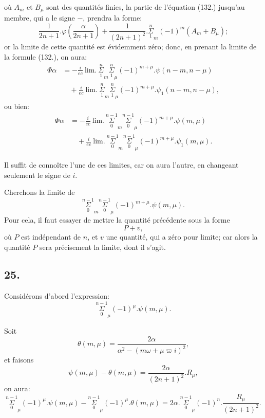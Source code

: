 \documentclass{article}
\begin{document}
où $A_{m}$ et $B_{\mu}$ sont des quantités finies, la partie de l'équation (132.) jusqu'au membre, qui a le signe $-$, prendra la forme:
\[ \frac{1}{2n+1}.\varphi\left(\frac{\alpha}{2n+1}\right)+\frac{1}{(2n+1)^{2}}.\overset{n}{\underset{1}{\Sigma}}_{m}(-1)^{m}(A_{m}+B_{\mu}); \]
or la limite de cette quantité est évidemment zéro; donc, en prenant la limite de la formule (132.), on aura:
\[ \begin{aligned}
\Phi\alpha&=-\frac{i}{ec}\ \text{lim.}\ \overset{n}{\underset{1}{\Sigma}}_{m}\overset{n}{\underset{1}{\Sigma}}_{\mu}(-1)^{m+\mu}.\psi(n-m,n-\mu)\\
&\quad+\frac{i}{ec}\ \text{lim.}\ \overset{n}{\underset{1}{\Sigma}}_{m}\overset{n}{\underset{1}{\Sigma}}_{\mu}(-1)^{m+\mu}.\psi_{1}(n-m,n-\mu),
\end{aligned} \]
ou bien:
\[ \begin{aligned}
\Phi\alpha&=-\frac{i}{ec}\ \text{lim.}\ \overset{n-1}{\underset{0}{\Sigma}}_{m}\overset{n-1}{\underset{0}{\Sigma}}_{\mu}(-1)^{m+\mu}.\psi(m,\mu)\\
&\quad+\frac{i}{ec}\ \text{lim.}\ \overset{n-1}{\underset{0}{\Sigma}}_{m}\overset{n-1}{\underset{0}{\Sigma}}_{\mu}(-1)^{m+\mu}.\psi_{1}(m,\mu).
\end{aligned} \tag{134.} \]

Il suffit de connoître l'une de ces limites, car on aura l'autre, en changeant seulement le signe de $i$.

Cherchons la limite de
\[ \overset{n-1}{\underset{0}{\Sigma}}_{m}\overset{n-1}{\underset{0}{\Sigma}}_{\mu}(-1)^{m+\mu}.\psi(m,\mu). \]
Pour cela, il faut essayer de mettre la quantité précédente sous la forme
\[ P+v, \]
où $P$ est indépendant de $n$, et $v$ une quantité, qui a zéro pour limite; car alors la quantité $P$ sera précisement la limite, dont il s'agit.

\subsection*{25.}

Considérons d'abord l'expression:
\[ \overset{n-1}{\underset{0}{\Sigma}}_{\mu}(-1)^{\mu}.\psi(m,\mu). \]

Soit
\[ \theta(m,\mu)=\frac{2\alpha}{\alpha^{2}-(m\omega+\mu\varpi i)^{2}}, \tag{135.} \]
et faisons
\[ \psi(m,\mu)-\theta(m,\mu)=\frac{2\alpha}{(2n+1)^{2}}.R_{\mu}, \tag{136.} \]
on aura:
\[ \overset{n-1}{\underset{0}{\Sigma}}_{\mu}(-1)^{\mu}.\psi(m,\mu)-\overset{n-1}{\underset{0}{\Sigma}}_{\mu}(-1)^{\mu}.\theta(m,\mu)=2\alpha.\overset{n-1}{\underset{0}{\Sigma}}_{\mu}(-1)^{n}.\frac{R_{\mu}}{(2n+1)^{2}}. \tag{137.} \]
\end{document}
